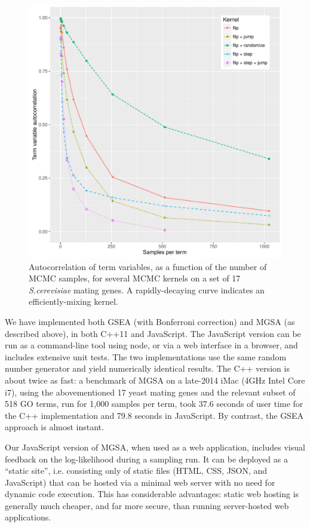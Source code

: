 \begin{figure}
\includegraphics[width=\columnwidth]{termAutoCorrelation}
\caption{
  \label{fig:termauto}
  Autocorrelation of term variables, as a function of the number of MCMC samples, for several MCMC kernels on a set of 17 {\em S.cerevisiae} mating genes.
  A rapidly-decaying curve indicates an efficiently-mixing kernel.
}
\end{figure}

We have implemented both GSEA (with Bonferroni correction) and MGSA (as described above), in both C++11 and JavaScript.
The JavaScript version can be run as a command-line tool using node, or via a web interface in a browser, and includes extensive unit tests.
The two implementations use the same random number generator and yield numerically identical results.
The C++ version is about twice as fast:
a benchmark of MGSA on a late-2014 iMac (4GHz Intel Core i7),
using the abovementioned 17 yeast mating genes and the relevant subset of 518 GO terms, run for 1,000 samples per term,
took 37.6 seconds of user time for the C++ implementation and 79.8 seconds in JavaScript.
By contrast, the GSEA approach is almost instant.

Our JavaScript version of MGSA, when used as a web application, includes visual feedback on the log-likelihood during a sampling run.
It can be deployed as a ``static site'',
i.e. consisting only of static files (HTML, CSS, JSON, and JavaScript) that can be hosted via a minimal web server with no need for dynamic code execution.
This has considerable advantages: static web hosting is generally much cheaper, and far more secure, than running server-hosted web applications.

